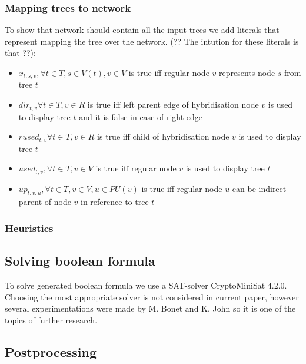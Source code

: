 \documentclass[runningheads, envcountsame, a4paper]{llncs}
\begin{document}
\subsubsection{Mapping trees to network}

To show that network should contain all the input trees we add literals that represent mapping the tree over the network. (?? The intution for these literals is that ??):

\begin{itemize}

\item $x_{t,s,v}, \forall t \in T, s \in V(t), v \in V$ is true iff regular node $v$ represents node $s$ from tree $t$

\item $dir_{t,v} \forall t \in T, v \in R$ is true iff left parent edge of hybridisation node $v$ is used to display tree $t$ and it is false in case of right edge

\item $rused_{t,v} \forall t \in T, v \in R$ is true iff child of hybridisation node $v$ is used to display tree $t$

\item $used_{t,v}, \forall t \in T, v \in V$ is true iff regular node $v$ is used to display tree $t$

\item $up_{t,v,u}, \forall t \in T, v \in V, u \in PU(v)$ is true iff regular node $u$ can be indirect parent of node $v$ in reference to tree $t$

\end{itemize}

\subsubsection{Heuristics}

\subsection{Solving boolean formula}

To solve generated boolean formula we use a SAT-solver CryptoMiniSat 4.2.0. Choosing the most appropriate solver is not considered in current paper, however several experimentations were made by M. Bonet and K. John \cite {bonet2009efficiently} so it is one of the topics of further research.

\subsection{Postprocessing}
\end{document}
